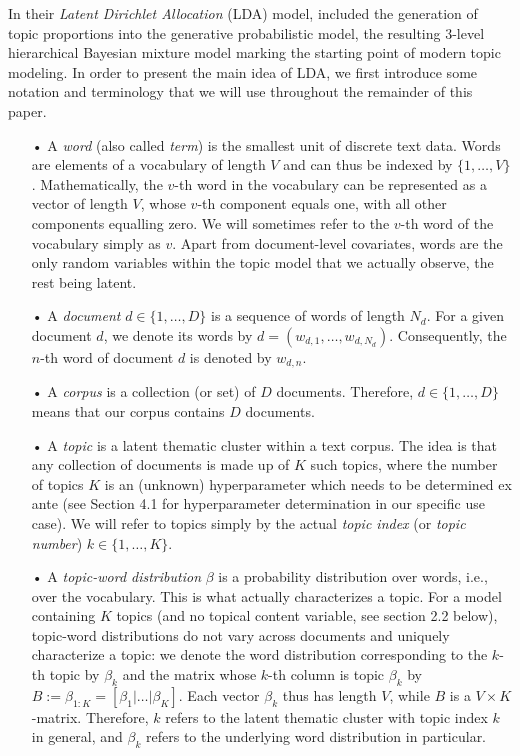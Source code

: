 In their \textit{Latent Dirichlet Allocation} (LDA) model, \cite{blei2003latent} included the generation of topic proportions into the generative probabilistic model, the resulting 3-level hierarchical Bayesian mixture model marking the starting point of modern topic modeling. In order to present the main idea of LDA, we first introduce some notation and terminology that we will use throughout the remainder of this paper.

\begin{itemize}
\vspace{-0.25cm}
\item[•] A \textit{word} (also called \textit{term}) is the smallest unit of discrete text data. Words are elements of a vocabulary of length $V$ and can thus be indexed by $\{1,\dots,V\}$. Mathematically, the $v$-th word in the vocabulary can be represented as a vector of length $V$, whose $v$-th component equals one, with all other components equalling zero. We will sometimes refer to the $v$-th word of the vocabulary simply as $v$. Apart from document-level covariates, words are the only random variables within the topic model that we actually observe, the rest being latent.
\vspace{-0.25cm}
\item[•] A \textit{document} $d \in \{1,\dots,D\}$ is a sequence of words of length $N_{d}$. For a given document $d$, we denote its words by $d=(w_{d,1},\dots,w_{d,N_{d}})$. Consequently, the $n$-th word of document $d$ is denoted by $w_{d,n}$.
\vspace{-0.25cm}
\item[•] A \textit{corpus} is a collection (or set) of $D$ documents. Therefore, $d \in \{1,\dots,D\}$ means that our corpus contains $D$ documents.
\vspace{-0.25cm}
\item[•] A \textit{topic} is a latent thematic cluster within a text corpus. The idea is that any collection of documents is made up of $K$ such topics, where the number of topics $K$ is an (unknown) hyperparameter which needs to be determined ex ante (see Section 4.1 for hyperparameter determination in our specific use case). We will refer to topics simply by the actual \textit{topic index} (or \textit{topic number}) $k \in \{1,\dots,K\}$.
\vspace{-0.25cm}
\item[•] A \textit{topic-word distribution} $\beta$ is a probability distribution over words, i.e., over the vocabulary. This is what actually characterizes a topic. For a model containing $K$ topics (and no topical content variable, see section 2.2 below), topic-word distributions do not vary across documents and uniquely characterize a topic: we denote the word distribution corresponding to the $k$-th topic by $\beta_k$ and the matrix whose $k$-th column is topic $\beta_k$ by $B:=\beta_{1:K}=[\beta_1|\dots|\beta_K]$. Each vector $\beta_k$ thus has length $V$, while $B$ is a $V \times K$-matrix. Therefore, $k$ refers to the latent thematic cluster with topic index $k$ in general, and $\beta_k$ refers to the underlying word distribution in particular.

\end{itemize}
